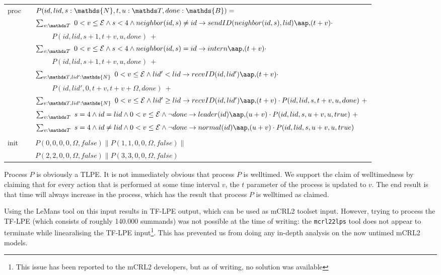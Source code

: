 \begin{tabular}{lcl}
proc & & $P(id,lid,s:\mathds{N},t,u:\TTT,done:\mathds{B}) = $ \\
     & & $\sum_{v:\TTT}~0 < v \leq \mathcal{E} \land s < 4 \land neighbor(id,s) \neq id \rightarrow sendID(neighbor(id,s),lid) \at (t+v) \cdot$ \\
     & & $\hspace{1cm} P(id,lid,s+1,t+v,u,done)~+$ \\
     & & $\sum_{v:\TTT}~0 < v \leq \mathcal{E} \land s < 4 \land neighbor(id,s)=id \rightarrow  intern \at (t+v) \cdot$ \\
     & & $\hspace{1cm} P(id,lid,s+1,t+v,u,done)~+$ \\
     & & $\sum_{v:\TTT,lid':\mathds{N}}~0 < v \leq \mathcal{E} \land lid'<lid \rightarrow recvID(id,lid') \at (t+v) \cdot$ \\
     & & $\hspace{1cm} P(id,lid',0,t+v,t+v+\Omega,done)~+$ \\
     & & $\sum_{v:\TTT,lid':\mathds{N}}~0 < v \leq \mathcal{E} \land lid' \geq lid \rightarrow recvID(id,lid') \at (t+v) \cdot  P(id,lid,s,t+v,u,done)~+$ \\
     & & $\sum_{v:\TTT}~s=4 \land id=lid \land 0 < v \leq \mathcal{E} \land \lnot done \rightarrow leader(id) \at (u+v) \cdot P(id,lid,s,u+v,u,true)~+$ \\
     & & $\sum_{v:\TTT}~s=4 \land id \neq lid \land 0 < v \leq \mathcal{E} \land \lnot done \rightarrow normal(id) \at (u+v) \cdot P(id,lid,s,u+v,u,true)$ \\
     & & \\
init & & $P(0,0,0,0,\Omega,false) \parallel P(1,1,0,0,\Omega,false) \parallel$ \\
     & & $P(2,2,0,0,\Omega,false) \parallel P(3,3,0,0,\Omega,false)$ \\
\end{tabular}

Process $P$ is obviously a TLPE. It is not immediately obvious that process $P$ is welltimed. We support the claim of welltimedness by claiming that for every action that is performed at some time interval $v$, the $t$ parameter of the process is updated to $v$. The end result is that time will always increase in the process, which has the result that process $P$ is welltimed as claimed.

Using the LeMans tool on this input results in TF-LPE output, which can be used as mCRL2 toolset input. However, trying to process the TF-LPE (which consists of roughly 140.000 summands) was not possible at the time of writing: the \texttt{mcrl22lps} tool does not appear to terminate while linearalising the TF-LPE input\footnote{This issue has been reported to the mCRL2 developers, but as of writing, no solution was available}. This has prevented us from doing any in-depth analysis on the now untimed mCRL2 models.
